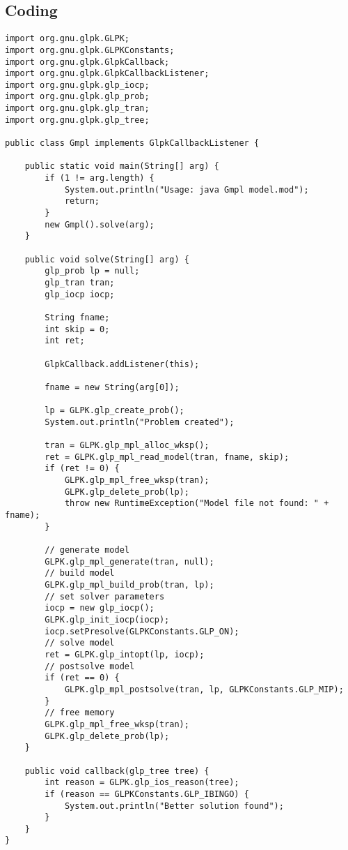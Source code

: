 \documentclass[a4paper,11pt]{report}
\begin{document}
\subsection{Coding}
\begin{lstlisting}
import org.gnu.glpk.GLPK;
import org.gnu.glpk.GLPKConstants;
import org.gnu.glpk.GlpkCallback;
import org.gnu.glpk.GlpkCallbackListener;
import org.gnu.glpk.glp_iocp;
import org.gnu.glpk.glp_prob;
import org.gnu.glpk.glp_tran;
import org.gnu.glpk.glp_tree;

public class Gmpl implements GlpkCallbackListener {

    public static void main(String[] arg) {
        if (1 != arg.length) {
            System.out.println("Usage: java Gmpl model.mod");
            return;
        }
        new Gmpl().solve(arg);
    }

    public void solve(String[] arg) {
        glp_prob lp = null;
        glp_tran tran;
        glp_iocp iocp;

        String fname;
        int skip = 0;
        int ret;

        GlpkCallback.addListener(this);

        fname = new String(arg[0]);

        lp = GLPK.glp_create_prob();
        System.out.println("Problem created");

        tran = GLPK.glp_mpl_alloc_wksp();
        ret = GLPK.glp_mpl_read_model(tran, fname, skip);
        if (ret != 0) {
            GLPK.glp_mpl_free_wksp(tran);
            GLPK.glp_delete_prob(lp);
            throw new RuntimeException("Model file not found: " + fname);
        }

        // generate model
        GLPK.glp_mpl_generate(tran, null);
        // build model
        GLPK.glp_mpl_build_prob(tran, lp);
        // set solver parameters
        iocp = new glp_iocp();
        GLPK.glp_init_iocp(iocp);
        iocp.setPresolve(GLPKConstants.GLP_ON);
        // solve model
        ret = GLPK.glp_intopt(lp, iocp);
        // postsolve model
        if (ret == 0) {
            GLPK.glp_mpl_postsolve(tran, lp, GLPKConstants.GLP_MIP);
        }
        // free memory
        GLPK.glp_mpl_free_wksp(tran);
        GLPK.glp_delete_prob(lp);
    }

    public void callback(glp_tree tree) {
        int reason = GLPK.glp_ios_reason(tree);
        if (reason == GLPKConstants.GLP_IBINGO) {
            System.out.println("Better solution found");
        }
    }
}
\end{lstlisting}
\end{document}
